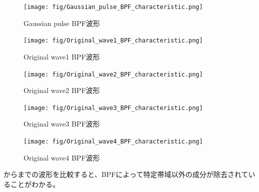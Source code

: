 \documentclass[11pt,dvipdfmx]{jarticle}
\begin{document}
\begin{figure}[H]
  \centering
  \texttt{[image: fig/Gaussian\_pulse\_BPF\_characteristic.png]}
  \caption{Gaussian pulse BPF波形}
  \label{fig:Gaussian_pulse_BPF}
\end{figure}
\begin{figure}[H]
  \centering
  \texttt{[image: fig/Original\_wave1\_BPF\_characteristic.png]}
  \caption{Original wave1 BPF波形}
  \label{fig:Original_wave1_BPF}
\end{figure}
\begin{figure}[H]
  \centering
  \texttt{[image: fig/Original\_wave2\_BPF\_characteristic.png]}
  \caption{Original wave2 BPF波形}
  \label{fig:Original_wave2_BPF}
\end{figure}
\begin{figure}[H]
  \centering
  \texttt{[image: fig/Original\_wave3\_BPF\_characteristic.png]}
  \caption{Original wave3 BPF波形}
  \label{fig:Original_wave3_BPF}
\end{figure}
\begin{figure}[H]
  \centering
  \texttt{[image: fig/Original\_wave4\_BPF\_characteristic.png]}
  \caption{Original wave4 BPF波形}
  \label{fig:Original_wave4_BPF}
\end{figure}
からまでの波形を比較すると、BPFによって特定帯域以外の成分が除去されていることがわかる。
\end{document}
